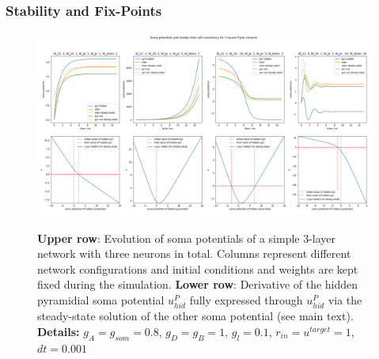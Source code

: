 \documentclass[12pt,a4paper]{article}
\begin{document}
\subsubsection{Stability and Fix-Points}
\begin{figure}[!ht]
  \centering
  \includegraphics[width=\linewidth]{img/stability.png}
  \label{fig:stability}
  \caption{\textbf{Upper row}: Evolution of soma potentials of a simple 3-layer network with three neurons in total. Columns represent different network configurations and initial conditions and weights are kept fixed during the simulation. \textbf{Lower row}: Derivative of the hidden pyramidial soma potential $u^P_{hid}$ fully expressed through $u^P_{hid}$ via the steady-state solution of the other soma potential (see main text). \textbf{Details: } $g_A = g_{som} = 0.8$, $g_D = g_B = 1$, $g_l = 0.1$, $r_{in} = u^{target} = 1$, $dt = 0.001$}
\end{figure}
\end{document}
